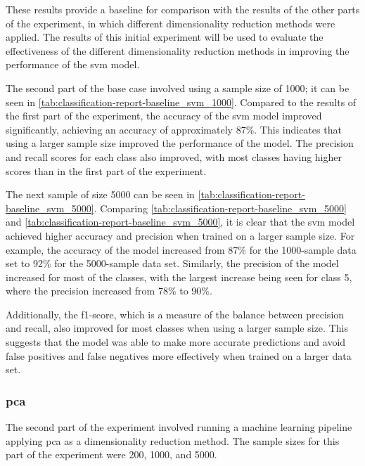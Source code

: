 These results provide a baseline for comparison with the results of the other parts of the experiment, in which different dimensionality reduction methods were applied. The results of this initial experiment will be used to evaluate the effectiveness of the different dimensionality reduction methods in improving the performance of the \gls{svm} model.

The second part of the base case involved using a sample size of 1000; it can be seen in \ref{tab:classification-report-baseline_svm_1000}. Compared to the results of the first part of the experiment, the accuracy of the \gls{svm} model improved significantly, achieving an accuracy of approximately 87\%. This indicates that using a larger sample size improved the performance of the model. The precision and recall scores for each class also improved, with most classes having higher scores than in the first part of the experiment.

The next sample of size 5000 can be seen in \ref{tab:classification-report-baseline_svm_5000}.
Comparing \ref{tab:classification-report-baseline_svm_5000} and \ref{tab:classification-report-baseline_svm_5000}, it is clear that the \gls{svm} model achieved higher accuracy and precision when trained on a larger sample size. For example, the accuracy of the model increased from 87\% for the 1000-sample data set to 92\% for the 5000-sample data set. Similarly, the precision of the model increased for most of the classes, with the largest increase being seen for class 5, where the precision increased from 78\% to 90\%.

Additionally, the f1-score, which is a measure of the balance between precision and recall, also improved for most classes when using a larger sample size. This suggests that the model was able to make more accurate predictions and avoid false positives and false negatives more effectively when trained on a larger data set.


\subsubsection{\gls{pca}}\label{subsubsec:experiment_4_pca}

The second part of the experiment involved running a machine learning pipeline applying \gls{pca} as a dimensionality reduction method. The sample sizes for this part of the experiment were 200, 1000, and 5000.

